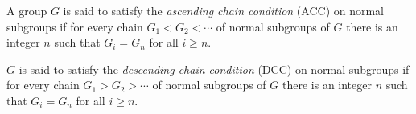 A group $G$ is said to satisfy the \emph{ascending chain condition} (ACC) on normal subgroups if for every chain $G_1 < G_2 < \cdots$ of normal subgroups of $G$ there is an integer $n$ such that $G_i = G_n$ for all $i \geq n$.

$G$ is said to satisfy the \emph{descending chain condition} (DCC) on normal subgroups if for every chain $G_1 > G_2 > \cdots$ of normal subgroups of $G$ there is an integer $n$ such that $G_i = G_n$ for all $i \geq n$.
